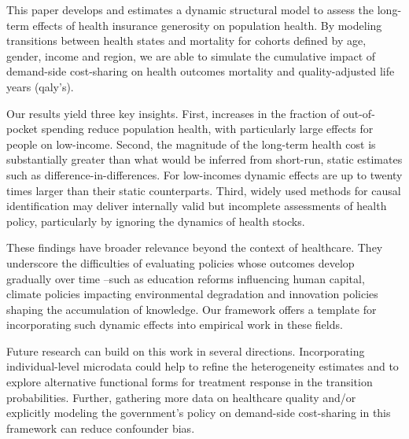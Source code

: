 \documentclass[a4paper,12pt]{article}
\begin{document}
This paper develops and estimates a dynamic structural model to assess the long-term effects of health insurance generosity on population health. By modeling transitions between health states and mortality for cohorts defined by age, gender, income and region, we are able to simulate the cumulative impact of demand-side cost-sharing on health outcomes mortality and quality-adjusted life years (qaly's).

Our results yield three key insights. First, increases in the fraction of out-of-pocket spending reduce population health, with particularly large effects for people on low-income. Second, the magnitude of the long-term health cost is substantially greater than what would be inferred from short-run, static estimates such as difference-in-differences. For low-incomes dynamic effects are up to twenty times larger than their static counterparts. Third, widely used methods for causal identification may deliver internally valid but incomplete assessments of health policy, particularly by ignoring the dynamics of health stocks.

These findings have broader relevance beyond the context of healthcare. They underscore the difficulties of evaluating policies whose outcomes develop gradually over time --such as education reforms influencing human capital, climate policies impacting environmental degradation and innovation policies shaping the accumulation of knowledge. Our framework offers a template for incorporating such dynamic effects into empirical work in these fields.

Future research can build on this work in several directions. Incorporating individual-level microdata could help to refine the heterogeneity estimates and to explore alternative functional forms for treatment response in the transition probabilities. Further, gathering more data on healthcare quality and/or explicitly modeling the government's policy on demand-side cost-sharing in this framework can reduce confounder bias.
\end{document}
